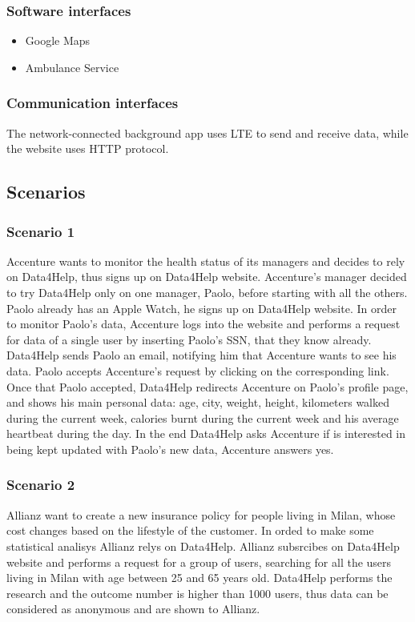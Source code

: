 \documentclass{article}
\begin{document}
\subsubsection{Software interfaces}
\begin{itemize}
	\item Google Maps
	\item Ambulance Service
\end{itemize}
\subsubsection{Communication interfaces}
The network-connected background app uses LTE to send and receive data, while the website uses HTTP protocol.
\subsection{Scenarios}
\subsubsection{Scenario 1}
Accenture wants to monitor the health status of its managers and decides to rely on Data4Help, thus signs up on Data4Help website.
Accenture's manager decided to try Data4Help only on one manager, Paolo, before starting with all the others. Paolo already has an Apple Watch, he signs up on Data4Help website.
In order to monitor Paolo's data, Accenture logs into the website and performs a request for data of a single user by inserting Paolo's SSN, that they know already.
Data4Help sends Paolo an email, notifying him that Accenture wants to see his data.
Paolo accepts Accenture's request by clicking on the corresponding link.
Once that Paolo accepted, Data4Help redirects Accenture on Paolo's profile page, and shows his main personal data: age, city, weight, height, kilometers walked during the current week, calories burnt during the current week and his average heartbeat during the day.
In the end Data4Help asks Accenture if is interested in being kept updated with Paolo's new data, Accenture answers yes.
\subsubsection{Scenario 2}
Allianz want to create a new insurance policy for people living in Milan, whose cost changes based on the lifestyle of the customer. In orded to make some statistical analisys Allianz relys on Data4Help.
Allianz subsrcibes on Data4Help website and performs a request for a group of users, searching for all the users living in Milan with age between 25 and 65 years old.
Data4Help performs the research and the outcome number is higher than 1000 users, thus data can be considered as anonymous and are shown to Allianz.
\end{document}
